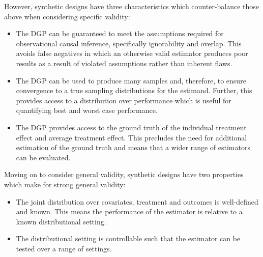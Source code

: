 \documentclass[../main.tex]{subfiles}
\begin{document}
\vspace{\baselineskip}
However, synthetic designs have three characteristics which counter-balance those above when considering specific validity:\par


\vspace{\baselineskip}
\begin{itemize}
	\item The DGP can be guaranteed to meet the assumptions required for observational causal inference, specifically ignorability and overlap. This avoids false negatives in which an otherwise valid estimator produces poor results as a result of violated assumptions rather than inherent flaws.\par


\vspace{\baselineskip}
	\item The DGP can be used to produce many samples and, therefore, to ensure convergence to a true sampling distributions for the estimand. Further, this provides access to a distribution over performance which is useful for quantifying best and worst case performance.\par


\vspace{\baselineskip}
	\item The DGP provides access to the ground truth of the individual treatment effect and average treatment effect. This precludes the need for additional estimation of the ground truth and means that a wider range of estimators can be evaluated.
\end{itemize}\par


\vspace{\baselineskip}
Moving on to consider general validity, synthetic designs have two properties which make for strong general validity:\par


\vspace{\baselineskip}
\begin{itemize}
	\item The joint distribution over covariates, treatment and outcomes is well-defined and known. This means the performance of the estimator is relative to a known distributional setting.\par


\vspace{\baselineskip}
	\item The distributional setting is controllable such that the estimator can be tested over a range of settings.
\end{itemize}\par
\end{document}

